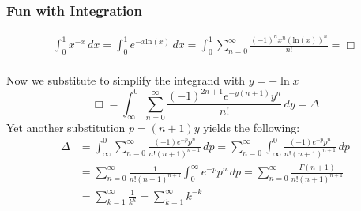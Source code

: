 \documentclass[11pt, xcolor=dvipsnames,aspectratio=169]{beamer}
\begin{document}
\color{white}
\begin{frame}
\frametitle{Fun with Integration}
\begin{eqnarray}
\boxed{\int_0^1 x^{-x} \,dx} = \int_0^1 e^{-x\text{ln}(x)} \,dx = \int_0^1 \sum_{n=0}^{\infty} \frac{(-1)^n x^n (\text{ln}(x))^n}{n!}  =\Box\\
\end{eqnarray}

Now we substitute to simplify the integrand with \(y=-\ln{x}\)
\begin{equation*}
\Box =\int_{\infty}^0 \sum_{n=0}^{\infty} \frac{(-1)^{2n+1} e^{-y(n+1)} y^n}{n!} \, dy= \Delta
\end{equation*}
Yet another substitution \( p=(n+1)y\) yields the following:\\
\begin{equation*}
\begin{split}
\Delta &= \int_{\infty}^0 \sum_{n=0}^{\infty} \frac{(-1) e^{-p} p^n}{n! (n+1)^{n+1}} \, dp =  \sum_{n=0}^{\infty} \int_{\infty}^0 \frac{(-1) e^{-p} p^n}{n! (n+1)^{n+1}} \, dp  \\
&=\sum_{n=0}^{\infty} \frac{1}{n! (n+1)^{n+1}}\int^{\infty}_0  e^{-p} p^n \, dp = \sum_{n=0}^{\infty} \frac{\Gamma (n+1)}{n! (n+1)^{n+1}} \\
&=\sum_{k=1}^{\infty} \frac{1}{k^k} =
\boxed{\sum_{k=1}^{\infty} k^{-k}}
\end{split}
\end{equation*}
\end{frame}
\end{document}
